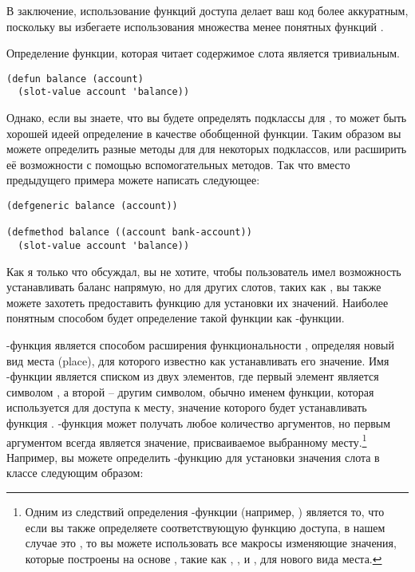 В заключение, использование функций доступа делает ваш код более аккуратным, поскольку вы
избегаете использования множества менее понятных функций .

Определение функции, которая читает содержимое слота  является тривиальным.

\begin{lstlisting}
(defun balance (account)
  (slot-value account 'balance))
\end{lstlisting}

Однако, если вы знаете, что вы будете определять подклассы для , то
может быть хорошей идеей определение  в качестве обобщенной функции.  Таким
образом вы можете определить разные методы для  для некоторых подклассов,
или расширить её возможности с помощью вспомогательных методов. Так что вместо предыдущего
примера можете написать следующее:

\begin{lstlisting}
(defgeneric balance (account))

(defmethod balance ((account bank-account))
  (slot-value account 'balance))
\end{lstlisting}

Как я только что обсуждал, вы не хотите, чтобы пользователь имел возможность устанавливать
баланс напрямую, но для других слотов, таких как , вы также можете
захотеть предоставить функцию для установки их значений.  Наиболее понятным способом будет
определение такой функции как -функции.

-функция является способом расширения функциональности , определяя
новый вид места (place), для которого известно как устанавливать его значение.  Имя
-функции является списком из двух элементов, где первый элемент является
символом , а второй -- другим символом, обычно именем функции, которая
используется для доступа к месту, значение которого будет устанавливать функция
.  -функция может получать любое количество аргументов, но первым
аргументом всегда является значение, присваиваемое выбранному месту.\footnote{Одним из
  следствий определения -функции (например, ) является то, что
  если вы также определяете соответствующую функцию доступа, в нашем случае это
  , то вы можете использовать все макросы изменяющие значения, которые построены
  на основе , такие как , ,  и , для
  нового вида места.}  Например, вы можете определить -функцию для установки
значения слота  в классе  следующим образом:

